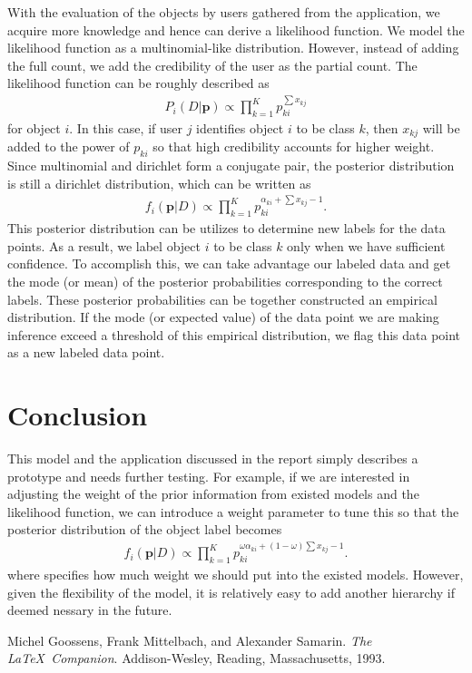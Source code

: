 \documentclass[a4paper,10pt]{article}
\begin{document}
\noindent With the evaluation of the objects by users gathered from the application, we acquire more knowledge and hence can derive a likelihood function. We model the likelihood function as a multinomial-like distribution. However, instead of adding the full count, we add the credibility of the user as the partial count. The likelihood function can be roughly described as
\begin{align}
P_i(D | \textbf{p}) \propto \prod \limits_{k=1}^{K}p_{ki}^{\sum x_{kj}}
\end{align}
for object $i$. In this case, if user $j$ identifies object $i$ to be class $k$, then $x_{kj}$ will be added to the power of $p_{ki}$ so that high credibility accounts for higher weight. Since multinomial and dirichlet form a conjugate pair, the posterior distribution is still a dirichlet distribution, which can be written as
\begin{align}
f_i(\textbf{p} | D) \propto \prod \limits_{k=1}^{K} p_{ki}^{\alpha_{ki} + \sum x_{kj}-1}.
\end{align}
\noindent This posterior distribution can be utilizes to determine new labels for the data points. As a result, we label object $i$ to be class $k$ only when we have sufficient confidence. To accomplish this, we can take advantage our labeled data and get the mode (or mean) of the posterior probabilities corresponding to the correct labels. These posterior probabilities can be together constructed an empirical distribution. If the mode (or expected value) of the data point we are making inference exceed a threshold of this empirical distribution, we flag this data point as a new labeled data point.

\section{Conclusion}
This model and the application discussed in the report simply describes a prototype and needs further testing. For example, if we are interested in adjusting the weight of the prior information from existed models and the likelihood function, we can introduce a weight parameter to tune this so that the posterior distribution of the object label becomes
\begin{align}
f_i(\textbf{p} | D) \propto \prod \limits_{k=1}^{K} p_{ki}^{\omega\alpha_{ki} + (1-\omega)\sum x_{kj}-1}.
\end{align}
where \omega specifies how much weight we should put into the existed models. However, given the flexibility of the model, it is relatively easy to add another hierarchy if deemed nessary in the future.

\medskip

\begin{thebibliography}{9}
 Michel Goossens, Frank Mittelbach, and Alexander Samarin. \textit{The \LaTeX\ Companion}. Addison-Wesley, Reading, Massachusetts, 1993.

\end{thebibliography}
\end{document}
